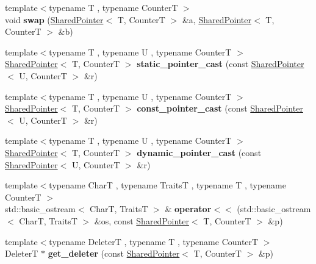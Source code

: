 \begin{DoxyCompactItemize}
{\footnotesize template$<$typename T , typename CounterT $>$ }\\void {\bfseries swap} (\hyperlink{classcugar_1_1_shared_pointer}{Shared\+Pointer}$<$ T, CounterT $>$ \&a, \hyperlink{classcugar_1_1_shared_pointer}{Shared\+Pointer}$<$ T, CounterT $>$ \&b)
\item 
\mbox{\label{namespacecugar_ae29bbd01f35c34164abb5ff6c4de15f8}} 
{\footnotesize template$<$typename T , typename U , typename CounterT $>$ }\\\hyperlink{classcugar_1_1_shared_pointer}{Shared\+Pointer}$<$ T, CounterT $>$ {\bfseries static\+\_\+pointer\+\_\+cast} (const \hyperlink{classcugar_1_1_shared_pointer}{Shared\+Pointer}$<$ U, CounterT $>$ \&r)
\item 
\mbox{\label{namespacecugar_a08558577658505bb90bfbc46e0752fc3}} 
{\footnotesize template$<$typename T , typename U , typename CounterT $>$ }\\\hyperlink{classcugar_1_1_shared_pointer}{Shared\+Pointer}$<$ T, CounterT $>$ {\bfseries const\+\_\+pointer\+\_\+cast} (const \hyperlink{classcugar_1_1_shared_pointer}{Shared\+Pointer}$<$ U, CounterT $>$ \&r)
\item 
\mbox{\label{namespacecugar_a357aaa46210e1a0d46f2a2b69abfe154}} 
{\footnotesize template$<$typename T , typename U , typename CounterT $>$ }\\\hyperlink{classcugar_1_1_shared_pointer}{Shared\+Pointer}$<$ T, CounterT $>$ {\bfseries dynamic\+\_\+pointer\+\_\+cast} (const \hyperlink{classcugar_1_1_shared_pointer}{Shared\+Pointer}$<$ U, CounterT $>$ \&r)
\item 
\mbox{\label{namespacecugar_a5782fd70440d44dc760d4036ff827183}} 
{\footnotesize template$<$typename CharT , typename TraitsT , typename T , typename CounterT $>$ }\\std\+::basic\+\_\+ostream$<$ CharT, TraitsT $>$ \& {\bfseries operator$<$$<$} (std\+::basic\+\_\+ostream$<$ CharT, TraitsT $>$ \&os, const \hyperlink{classcugar_1_1_shared_pointer}{Shared\+Pointer}$<$ T, CounterT $>$ \&p)
\item 
\mbox{\label{namespacecugar_ab6161cc7b00c065ae9916e8f1e00ad7d}} 
{\footnotesize template$<$typename DeleterT , typename T , typename CounterT $>$ }\\DeleterT $\ast$ {\bfseries get\+\_\+deleter} (const \hyperlink{classcugar_1_1_shared_pointer}{Shared\+Pointer}$<$ T, CounterT $>$ \&p)

\end{DoxyCompactItemize}
